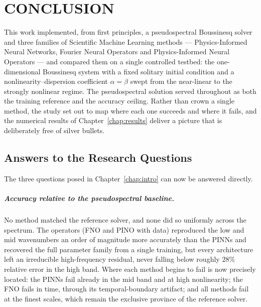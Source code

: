 \chapter{CONCLUSION}
\label{chap:conclusions}

This work implemented, from first principles, a pseudospectral Boussinesq solver and three families of Scientific Machine Learning methods --- Physics-Informed Neural Networks, Fourier Neural Operators and Physics-Informed Neural Operators --- and compared them on a single controlled testbed: the one-dimensional Boussinesq system with a fixed solitary initial condition and a nonlinearity--dispersion coefficient $\alpha = \beta$ swept from the near-linear to the strongly nonlinear regime. The pseudospectral solution served throughout as both the training reference and the accuracy ceiling. Rather than crown a single method, the study set out to map where each one succeeds and where it fails, and the numerical results of Chapter~\ref{chap:results} deliver a picture that is deliberately free of silver bullets.

\section{Answers to the Research Questions}

The three questions posed in Chapter~\ref{chap:intro} can now be answered directly.

\paragraph{Accuracy relative to the pseudospectral baseline.} No method matched the reference solver, and none did so uniformly across the spectrum. The operators (FNO and PINO with data) reproduced the low and mid wavenumbers an order of magnitude more accurately than the PINNs and recovered the full parameter family from a single training, but every architecture left an irreducible high-frequency residual, never falling below roughly $28\%$ relative error in the high band. Where each method begins to fail is now precisely located: the PINNs fail already in the mid band and at high nonlinearity; the FNO fails in time, through its temporal-boundary artifact; and all methods fail at the finest scales, which remain the exclusive province of the reference solver.

